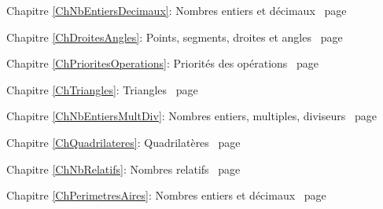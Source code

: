 \documentclass[TS]{sesamanuel}
\begin{document}
\begin{commentaire}

\textcolor{PartieFonction}{\PrerequisTitleFont 
Chapitre \ref{ChNbEntiersDecimaux}: Nombres entiers et décimaux \dotfill\ page \pageref{ChNbEntiersDecimaux}}

\vspace{2em}

\textcolor{PartieGeometrie}{\PrerequisTitleFont 
Chapitre \ref{ChDroitesAngles}: Points, segments, droites et angles \dotfill\ page \pageref{ChDroitesAngles}}

\vspace{2em}

\textcolor{PartieFonction}{\PrerequisTitleFont 
Chapitre \ref{ChPrioritesOperations}: Priorités des opérations \dotfill\ page \pageref{ChPrioritesOperations}}

\vspace{2em}

\textcolor{PartieGeometrie}{\PrerequisTitleFont 
Chapitre \ref{ChTriangles}: Triangles \dotfill\ page \pageref{ChTriangles}}

\vspace{2em}

\textcolor{PartieFonction}{\PrerequisTitleFont 
Chapitre \ref{ChNbEntiersMultDiv}: Nombres entiers, multiples, diviseurs \dotfill\ page \pageref{ChNbEntiersMultDiv}}

\vspace{2em}

\textcolor{PartieGeometrie}{\PrerequisTitleFont 
Chapitre \ref{ChQuadrilateres}: Quadrilatères \dotfill\ page \pageref{ChQuadrilateres}}

\vspace{2em}

\textcolor{PartieFonction}{\PrerequisTitleFont 
Chapitre \ref{ChNbRelatifs}: Nombres relatifs \dotfill\ page \pageref{ChNbRelatifs}}

\vspace{2em}

\textcolor{PartieFonction}{\PrerequisTitleFont 
Chapitre \ref{ChPerimetresAires}: Nombres entiers et décimaux \dotfill\ page \pageref{ChPerimetresAires}}

\vspace{2em}

\end{commentaire}

\vfill

\end{document}
